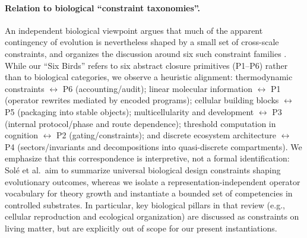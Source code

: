 \documentclass[11pt]{article}
\begin{document}
\paragraph{Relation to biological ``constraint taxonomies''.}
An independent biological viewpoint argues that much of the apparent contingency of evolution is nevertheless shaped by a small set of cross-scale constraints, and organizes the discussion around six such constraint families \citep{SoleEtAl2024Constraints}. While our ``Six Birds'' refers to six abstract closure primitives (P1--P6) rather than to biological categories, we observe a heuristic alignment: thermodynamic constraints $\leftrightarrow$ P6 (accounting/audit); linear molecular information $\leftrightarrow$ P1 (operator rewrites mediated by encoded programs); cellular building blocks $\leftrightarrow$ P5 (packaging into stable objects); multicellularity and development $\leftrightarrow$ P3 (internal protocol/phase and route dependence); threshold computation in cognition $\leftrightarrow$ P2 (gating/constraints); and discrete ecosystem architecture $\leftrightarrow$ P4 (sectors/invariants and decompositions into quasi-discrete compartments). We emphasize that this correspondence is interpretive, not a formal identification: Sol{\'e} et al.\ aim to summarize universal biological design constraints shaping evolutionary outcomes, whereas we isolate a representation-independent operator vocabulary for theory growth and instantiate a bounded set of competencies in controlled substrates. In particular, key biological pillars in that review (e.g., cellular reproduction and ecological organization) are discussed as constraints on living matter, but are explicitly out of scope for our present instantiations.
\end{document}
